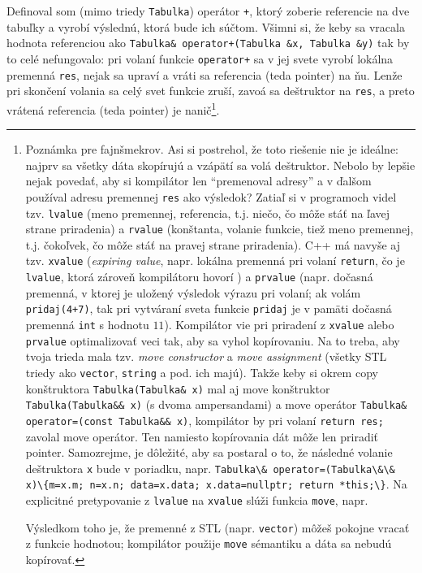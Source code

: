 \documentclass[10pt]{article}
\def\prg{\lstinline}
\begin{document}
Definoval som (mimo triedy {\tt Tabulka}) operátor {\tt +}, ktorý zoberie 
referencie na dve tabuľky a vyrobí výslednú, ktorá bude ich súčtom. Všimni si,
že keby sa vracala hodnota referenciou ako
\prg!Tabulka& operator+(Tabulka &x, Tabulka &y)! tak by to celé nefungovalo:
pri volaní funkcie \prg!operator+! sa v jej svete vyrobí lokálna premenná {\tt res},
nejak sa upraví a vráti sa referencia (teda pointer) na ňu. Lenže pri skončení
volania sa celý svet funkcie zruší, zavoá sa deštruktor na {\tt res}, a preto
vrátená referencia (teda pointer) je nanič\footnote{
Poznámka pre fajnšmekrov. Asi si postrehol, že toto riešenie nie je ideálne:
najprv sa všetky dáta skopírujú a vzápätí sa volá deštruktor. Nebolo by lepšie
nejak povedať, aby si kompilátor len ``premenoval adresy'' a v ďalšom používal
adresu premennej {\tt res} ako výsledok? Zatiaľ si v programoch videl tzv. {\tt lvalue} 
(meno premennej, referencia, t.j. niečo, čo môže stáť na ľavej strane priradenia)
a {\tt rvalue} (konštanta, volanie funkcie, tiež meno premennej, t.j. čokoľvek,
čo môže stáť na pravej strane priradenia). C++ má navyše aj tzv. {\tt xvalue}
({\em expiring value}, napr. lokálna premenná pri volaní \prg!return!, 
čo je {\tt lvalue}, ktorá zároveň
kompilátoru hovorí ) a {\tt prvalue} (napr. dočasná premenná,
v ktorej je uložený výsledok výrazu pri volaní; ak volám \prg!pridaj(4+7)!,
tak pri vytváraní sveta funkcie {\tt pridaj} je v pamäti dočasná premenná \prg!int!
s hodnotu $11$). Kompilátor vie pri priradení z {\tt xvalue} alebo {\tt prvalue}
optimalizovať veci tak, aby sa vyhol kopírovaniu. Na to treba, aby tvoja
trieda mala tzv. {\em move constructor} a {\em move assignment} 
(všetky STL triedy ako \prg!vector!, 
\prg!string! a pod. ich majú). Takže keby si okrem copy konštruktora 
\prg!Tabulka(Tabulka& x)! mal aj move konštruktor \prg!Tabulka(Tabulka&& x)! (s dvoma
ampersandami) a move operátor  \prg!Tabulka& operator=(const Tabulka&& x)!,
kompilátor by pri volaní \prg!return res;! zavolal move operátor. Ten namiesto
kopírovania dát môže len priradiť pointer.
Samozrejme, je dôležité, aby sa  postaral o to, že následné
volanie deštruktora {\tt x} bude v poriadku, napr. 
\prg!Tabulka\& operator=(Tabulka\&\& x)\{m=x.m; n=x.n; data=x.data; x.data=nullptr; return *this;\}!.
Na explicitné pretypovanie z {\tt lvalue} na {\tt xvalue} slúži
funkcia {\tt move}, napr.

\usebox{\TmpBox}

Výsledkom toho je, že premenné z STL (napr. {\tt vector}) môžeš pokojne vracať z funkcie
hodnotou; kompilátor použije {\tt move} sémantiku a dáta sa nebudú kopírovať.
}.
\end{document}
